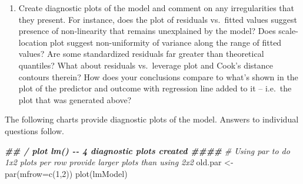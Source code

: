 \documentclass[
]{article}
\newenvironment{Shaded}{\begin{snugshade}}{\end{snugshade}}
\newcommand{\AttributeTok}[1]{\textcolor[rgb]{0.77,0.63,0.00}{#1}}
\newcommand{\CommentTok}[1]{\textcolor[rgb]{0.56,0.35,0.01}{\textit{#1}}}
\newcommand{\DecValTok}[1]{\textcolor[rgb]{0.00,0.00,0.81}{#1}}
\newcommand{\DocumentationTok}[1]{\textcolor[rgb]{0.56,0.35,0.01}{\textbf{\textit{#1}}}}
\newcommand{\FunctionTok}[1]{\textcolor[rgb]{0.00,0.00,0.00}{#1}}
\newcommand{\NormalTok}[1]{#1}
\newcommand{\OtherTok}[1]{\textcolor[rgb]{0.56,0.35,0.01}{#1}}
\providecommand{\tightlist}{%
  \setlength{\itemsep}{0pt}\setlength{\parskip}{0pt}}
\begin{document}
\begin{enumerate}
\def\labelenumi{\arabic{enumi}.}
\setcounter{enumi}{3}
\tightlist
\item
  Create diagnostic plots of the model and comment on any irregularities
  that they present. For instance, does the plot of residuals vs.~fitted
  values suggest presence of non-linearity that remains unexplained by
  the model? Does scale-location plot suggest non-uniformity of variance
  along the range of fitted values? Are some standardized residuals far
  greater than theoretical quantiles? What about residuals vs.~leverage
  plot and Cook's distance contours therein? How does your conclusions
  compare to what's shown in the plot of the predictor and outcome with
  regression line added to it -- i.e.~the plot that was generated above?
\end{enumerate}

The following charts provide diagnostic plots of the model. Answers to
individual questions follow.

\begin{Shaded}
\begin{Highlighting}[]
\DocumentationTok{\#\# / plot lm() {-}{-} 4 diagnostic plots created                                          \#\#\#\#}
\CommentTok{\# Using par to do 1x2 plots per row provide larger plots than using 2x2}
\NormalTok{old.par }\OtherTok{\textless{}{-}} \FunctionTok{par}\NormalTok{(}\AttributeTok{mfrow=}\FunctionTok{c}\NormalTok{(}\DecValTok{1}\NormalTok{,}\DecValTok{2}\NormalTok{))}
\FunctionTok{plot}\NormalTok{(lmModel)}
\end{Highlighting}
\end{Shaded}
\end{document}
